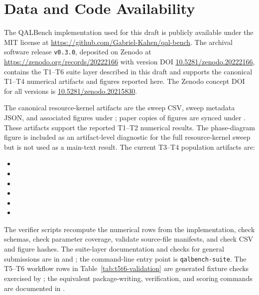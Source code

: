\documentclass[11pt]{article}
\begin{document}
\section*{Data and Code Availability}

The QALBench implementation used for this draft is publicly available under the MIT license at \url{https://github.com/Gabriel-Kahen/qal-bench}. The archival software release \texttt{v0.3.0}, deposited on Zenodo at \url{https://zenodo.org/records/20222166} with version DOI \href{https://doi.org/10.5281/zenodo.20222166}{10.5281/zenodo.20222166}, contains the T1--T6 suite layer described in this draft and supports the canonical T1--T4 numerical artifacts and figures reported here. The Zenodo concept DOI for all versions is \href{https://doi.org/10.5281/zenodo.20215830}{10.5281/zenodo.20215830}.

The canonical resource-kernel artifacts are the sweep CSV, sweep metadata JSON, and associated figures under ; paper copies of figures are synced under . These artifacts support the reported T1--T2 numerical results. The phase-diagram figure is included as an artifact-level diagnostic for the full resource-kernel sweep but is not used as a main-text result. The current T3--T4 population artifacts are:
\begin{itemize}
\item {}
\item {}
\item {}
\item {}
\item {}
\item {}
\end{itemize}
The verifier scripts recompute the numerical rows from the implementation, check schemas, check parameter coverage, validate source-file manifests, and check CSV and figure hashes. The suite-layer documentation and checks for general submissions are in  and ; the command-line entry point is \texttt{qalbench-suite}. The T5--T6 workflow rows in Table~\ref{tab:t5t6-validation} are generated fixture checks exercised by ; the equivalent package-writing, verification, and scoring commands are documented in .
\end{document}
